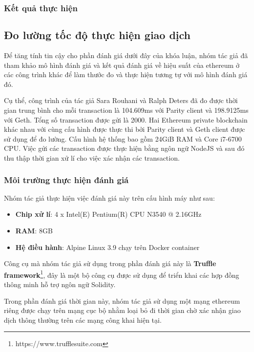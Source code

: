 \documentclass[../main-report.tex]{subfiles}
\begin{document}
\subsubsection{Kết quả thực hiện}


\subsection{Đo lường tốc độ thực hiện giao dịch}
Để tăng tính tin cậy cho phần đánh giá dưới đây của khóa luận, nhóm tác giả đã tham khảo mô hình đánh giá và kết quả đánh giá về hiệu suất của ethereum ở các công trình khác để làm thước đo và thực hiện tương tự với mô hình đánh giá đó.

Cụ thể, công trình của tác giả Sara Rouhani và Ralph Deters \cite{rouhani2017performance} đã đo được thời gian trung bình cho mỗi \gls{transaction} là 104.609ms với Parity client và 198.9125ms với Geth. Tổng số \gls{transaction} được gửi là 2000. Hai Ethereum private \gls{blockchain} khác nhau với cùng cấu hình được thực thi bởi Parity client và Geth client được sử dụng để đo lường. Cấu hình hệ thống bao gồm 24GiB RAM và Core i7-6700 CPU. Việc gửi các \gls{transaction} được thực hiện bằng ngôn ngữ NodeJS và sau đó thu thập thời gian xử lí cho việc xác nhận các \gls{transaction}.

\subsubsection{Môi trường thực hiện đánh giá}
Nhóm tác giả thực hiện việc đánh giá này trên cấu hình máy như sau:

\begin{itemize}
\item \textbf{Chip xử lí}: 4 x Intel(E) Pentium(R) CPU N3540 @ 2.16GHz
\item \textbf{RAM}: 8GB
\item \textbf{Hệ điều hành}: Alpine Linux 3.9 chạy trên Docker container
\end{itemize}

Công cụ mà nhóm tác giả sử dụng trong phần đánh giá này là \textbf{Truffle framework}\footnote{https://www.trufflesuite.com}, đây là một bộ công cụ được sử dụng để triển khai các hợp đồng thông minh hỗ trợ ngôn ngữ Solidity.

Trong phần đánh giá thời gian này, nhóm tác giả sử dụng một mạng ethereum riêng được chạy trên mạng cục bộ nhằm loại bỏ đi thời gian chờ xác nhận giao dịch thông thường trên các mạng công khai hiện tại.
\end{document}
